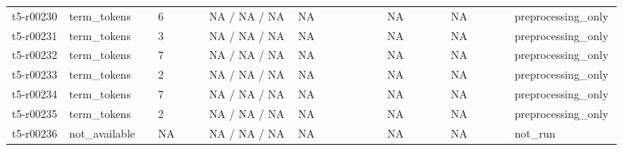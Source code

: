 \begin{longtable}{@{}p{0.09\linewidth}p{0.14\linewidth}p{0.08\linewidth}p{0.14\linewidth}p{0.14\linewidth}p{0.1\linewidth}p{0.1\linewidth}p{0.11\linewidth}@{}}
t5-r00230 & term\_\allowbreak{}tokens & 6 & NA / NA / NA & NA & NA & NA & preprocessing\_\allowbreak{}only \\
t5-r00231 & term\_\allowbreak{}tokens & 3 & NA / NA / NA & NA & NA & NA & preprocessing\_\allowbreak{}only \\
t5-r00232 & term\_\allowbreak{}tokens & 7 & NA / NA / NA & NA & NA & NA & preprocessing\_\allowbreak{}only \\
t5-r00233 & term\_\allowbreak{}tokens & 2 & NA / NA / NA & NA & NA & NA & preprocessing\_\allowbreak{}only \\
t5-r00234 & term\_\allowbreak{}tokens & 7 & NA / NA / NA & NA & NA & NA & preprocessing\_\allowbreak{}only \\
t5-r00235 & term\_\allowbreak{}tokens & 2 & NA / NA / NA & NA & NA & NA & preprocessing\_\allowbreak{}only \\
t5-r00236 & not\_\allowbreak{}available & NA & NA / NA / NA & NA & NA & NA & not\_\allowbreak{}run \\
\hline
\end{longtable}
\endgroup
